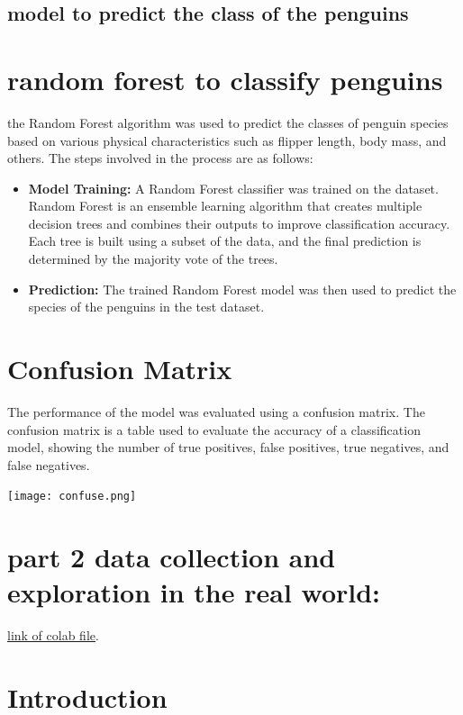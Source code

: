 \documentclass[12pt]{article}
\begin{document}
\subsection*{model to predict the class of the penguins}
\section*{random forest to classify penguins}

the Random Forest algorithm was used to predict the classes of penguin species based on various physical characteristics such as flipper length, body mass, and others. The steps involved in the process are as follows:

\begin{itemize}
    
    \item \textbf{Model Training:} A Random Forest classifier was trained on the dataset. Random Forest is an ensemble learning algorithm that creates multiple decision trees and combines their outputs to improve classification accuracy. Each tree is built using a subset of the data, and the final prediction is determined by the majority vote of the trees.

    \item \textbf{Prediction:} The trained Random Forest model was then used to predict the species of the penguins in the test dataset.
\end{itemize}

\section*{Confusion Matrix}

The performance of the model was evaluated using a confusion matrix. The confusion matrix is a table used to evaluate the accuracy of a classification model, showing the number of true positives, false positives, true negatives, and false negatives. 


    \texttt{[image: confuse.png]}  %
\section*{ part 2 data collection and exploration in the real world:}
\href{https://colab.research.google.com/drive/1L_XTsoIVB7QVzclWriRlnPwsjELKFMlw?usp=sharing}{link of colab file}.
\section*{Introduction}
\end{document}
